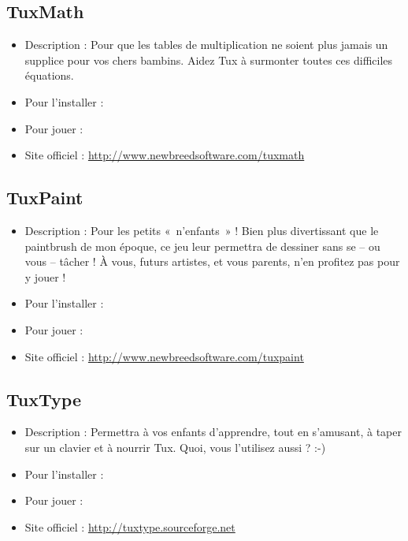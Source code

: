 \subsection{TuxMath}
\begin{itemize}
\begingroup
{}
\item Description : Pour que les tables de multiplication ne soient plus jamais un supplice pour vos chers bambins. Aidez Tux à surmonter toutes ces difficiles équations.{\par}
\item Pour l'installer : 
\item Pour jouer : 
\item Site officiel : \url{http://www.newbreedsoftware.com/tuxmath}{\par}
\endgroup
\end{itemize}
\subsection{TuxPaint}
\begin{itemize}
\begingroup
{}
\item Description : Pour les petits «~n'enfants~» ! Bien plus divertissant que le paintbrush de mon époque, ce jeu leur permettra de dessiner sans se -- ou vous -- tâcher ! À vous, futurs artistes, et vous parents, n'en profitez pas pour y jouer !{\par}
\item Pour l'installer : 
\item Pour jouer : 
\item Site officiel : \url{http://www.newbreedsoftware.com/tuxpaint}{\par}
\endgroup
\end{itemize}
\subsection{TuxType}
\begin{itemize}
\begingroup
{}
\item Description : Permettra à vos enfants d'apprendre, tout en s'amusant, à taper sur un clavier et à nourrir Tux. Quoi, vous l'utilisez aussi ? :-){\par}
\item Pour l'installer : 
\item Pour jouer : 
\item Site officiel : \url{http://tuxtype.sourceforge.net}{\par}
\endgroup
\end{itemize}

